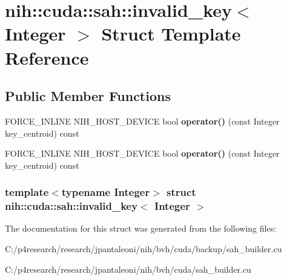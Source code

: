 \hypertarget{structnih_1_1cuda_1_1sah_1_1invalid__key}{
\section{nih\-:\-:cuda\-:\-:sah\-:\-:invalid\-\_\-key$<$ \-Integer $>$ \-Struct \-Template \-Reference}
\label{structnih_1_1cuda_1_1sah_1_1invalid__key}
}
\subsection*{\-Public \-Member \-Functions}
\begin{DoxyCompactItemize}
\item 
\hypertarget{structnih_1_1cuda_1_1sah_1_1invalid__key_a9f19d565a09df9a259495329197fff06}{
\-F\-O\-R\-C\-E\-\_\-\-I\-N\-L\-I\-N\-E \-N\-I\-H\-\_\-\-H\-O\-S\-T\-\_\-\-D\-E\-V\-I\-C\-E bool {\bfseries operator()} (const \-Integer key\-\_\-centroid) const }
\label{structnih_1_1cuda_1_1sah_1_1invalid__key_a9f19d565a09df9a259495329197fff06}

\item 
\hypertarget{structnih_1_1cuda_1_1sah_1_1invalid__key_a9f19d565a09df9a259495329197fff06}{
\-F\-O\-R\-C\-E\-\_\-\-I\-N\-L\-I\-N\-E \-N\-I\-H\-\_\-\-H\-O\-S\-T\-\_\-\-D\-E\-V\-I\-C\-E bool {\bfseries operator()} (const \-Integer key\-\_\-centroid) const }
\label{structnih_1_1cuda_1_1sah_1_1invalid__key_a9f19d565a09df9a259495329197fff06}

\end{DoxyCompactItemize}
\subsubsection*{template$<$typename Integer$>$ struct nih\-::cuda\-::sah\-::invalid\-\_\-key$<$ Integer $>$}



\-The documentation for this struct was generated from the following files\-:\begin{DoxyCompactItemize}
\item 
\-C\-:/p4research/research/jpantaleoni/nih/bvh/cuda/backup/sah\-\_\-builder.\-cu\item 
\-C\-:/p4research/research/jpantaleoni/nih/bvh/cuda/sah\-\_\-builder.\-cu\end{DoxyCompactItemize}
